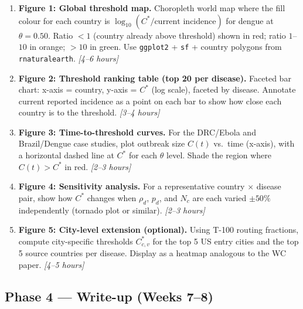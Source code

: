 \documentclass[12pt]{article}
\begin{document}
\begin{enumerate}[label=\textbf{T\arabic*.}, resume]

  \item \textbf{Figure 1: Global threshold map.}
    Choropleth world map where the fill colour for each country is
    $\log_{10}(C^*/\text{current incidence})$ for dengue at
    $\theta = 0.50$.
    Ratio $< 1$ (country already above threshold) shown in red;
    ratio $1$--$10$ in orange; $> 10$ in green.
    Use \texttt{ggplot2} + \texttt{sf} + country polygons from
    \texttt{rnaturalearth}.
    \textit{[4--6 hours]}

  \item \textbf{Figure 2: Threshold ranking table (top 20 per disease).}
    Faceted bar chart: x-axis = country, y-axis = $C^*$ (log scale),
    faceted by disease. Annotate current reported incidence as a
    point on each bar to show how close each country is to the
    threshold.
    \textit{[3--4 hours]}

  \item \textbf{Figure 3: Time-to-threshold curves.}
    For the DRC/Ebola and Brazil/Dengue case studies, plot
    outbreak size $C(t)$ vs.\ time (x-axis), with a horizontal
    dashed line at $C^*$ for each $\theta$ level. Shade the
    region where $C(t) > C^*$ in red.
    \textit{[2--3 hours]}

  \item \textbf{Figure 4: Sensitivity analysis.}
    For a representative country $\times$ disease pair, show how
    $C^*$ changes when $\rho_d$, $p_d$, and $N_c$ are each varied
    $\pm 50\%$ independently (tornado plot or similar).
    \textit{[2--3 hours]}

  \item \textbf{Figure 5: City-level extension (optional).}
    Using T-100 routing fractions, compute city-specific thresholds
    $C_{c,v}^*$ for the top 5 US entry cities and the top 5 source
    countries per disease. Display as a heatmap analogous to the
    WC paper.
    \textit{[4--5 hours]}

\end{enumerate}

\subsection{Phase 4 --- Write-up (Weeks 7--8)}
\end{document}
